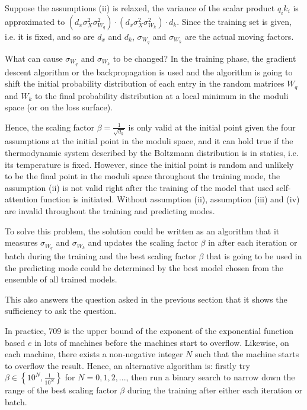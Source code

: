 \documentclass{article}
\theoremstyle{plain}
\theoremstyle{plain} %
\theoremstyle{definition}  %
\theoremstyle{remark}  %
\theoremstyle{plain}
\begin{document}
Suppose the assumptions (ii) is relaxed, the variance of the scalar product $q_ik_i$ is approximated to $\left( d_x \sigma_X^2 \sigma_{W_q}^2\right)\cdot\left(d_x \sigma_X^2 \sigma_{W_k}^2\right)\cdot d_k$. Since the training set is given, i.e. it is fixed, and so are $d_x$ and $d_k$, $\sigma_{W_q}$ and $\sigma_{W_k}$ are the actual moving factors. 

What can cause $\sigma_{W_q}$ and $\sigma_{W_k}$ to be changed? In the training phase, the gradient descent algorithm or the backpropagation is used and the algorithm is going to shift the initial probability distribution of each entry in the random matrices $W_q$ and $W_k$ to the final probability distribution at a local minimum in the moduli space (or on the loss surface).

Hence, the scaling factor $\beta=\frac{1}{\sqrt{d_k}}$ is only valid at the initial point given the four assumptions at the initial point in the moduli space, and it can hold true if the thermodynamic system described by the Boltzmann distribution is in statics, i.e. its temperature is fixed. However, since the initial point is random and unlikely to be the final point in the moduli space throughout the training mode, the assumption (ii) is not valid right after the training of the model that used self-attention function is initiated. Without assumption (ii), assumption (iii) and (iv) are invalid throughout the training and predicting modes.


To solve this problem, the solution could be written as an algorithm that it measures $\sigma_{W_q}$ and $\sigma_{W_k}$ and updates the scaling factor $\beta$ in after each iteration or batch during the training and the best scaling factor $\beta$ that is going to be used in the predicting mode could be determined by the best model chosen from the ensemble of all trained models.

This also answers the question asked in the previous section that it shows the sufficiency to ask the question.


In practice, 709 is the upper bound of the exponent of the exponential function based $e$ in lots of machines before the machines start to overflow. Likewise, on each machine, there exists a non-negative integer $N$ such that the machine starts to overflow the result. Hence, an alternative algorithm is: firstly try $ \beta \in \left\lbrace 10^N, \frac{1}{10^N} \right\rbrace$ for $N=0,1,2,...$, then run a binary search to narrow down the range of the best scaling factor $\beta$ during the training after either each iteration or batch.
\end{document}
